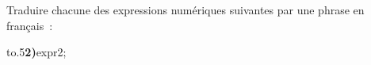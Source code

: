 \documentclass[exercice]{thedocument}%
\begin{document}
%
Traduire chacune des expressions numériques suivantes par une phrase en français~:\par\vskip10pt
\hbox{\hbox to.5\hbox{{\bfseries 2)}\hskip5pt\<expr2;\hfill}}\par\vskip10pt
\end{document}
